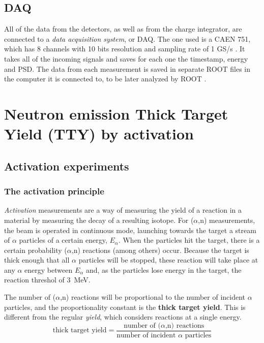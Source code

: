\documentclass[a4paper,12pt]{report}
\newcommand{\an}{($\alpha$,n) }
\begin{document}
\section{DAQ}
All of the data from the detectors, as well as from the charge integrator, are connected to a \textit{data acquisition system}, or DAQ.
The one used is a CAEN 751, which has 8 channels with 10 bits resolution and sampling rate of 1 GS/s \cite{CAEN}.
It takes all of the incoming signals and saves for each one the timestamp, energy and PSD.
The data from each measurement is saved in separate ROOT files in the computer it is connected to, to be later analyzed by ROOT \cite{ROOT}.


\chapter{Neutron emission Thick Target Yield (TTY) by activation}

\section{Activation experiments}

\subsection{The activation principle}
\textit{Activation} measurements are a way of measuring the yield of a reaction in a material by measuring the decay of a resulting isotope.
For \an measurements, the beam is operated in continuous mode, launching towards the target a stream of $\alpha$ particles of a certain energy, $E_\alpha$.
When the particles hit the target, there is a certain probability \an reactions (among others) occur.
Because the target is thick enough that all $\alpha$ particles will be stopped, these reaction will take place at any $\alpha$ energy between $E_\alpha$ and, as the particles lose energy in the target, the reaction threshol of \qty{3}{\MeV}.

The number of \an reactions will be proportional to the number of incident $\alpha$ particles, and the proportionality constant is the \textbf{thick target yield}.
This is different from the regular \textit{yield}, which considers reactions at a single energy.
\begin{equation}
	\text{thick target yield} = \frac{\text{number of \an reactions}}{\text{number of incident $\alpha$ particles}}
	\label{tty_def}
\end{equation}
\end{document}
